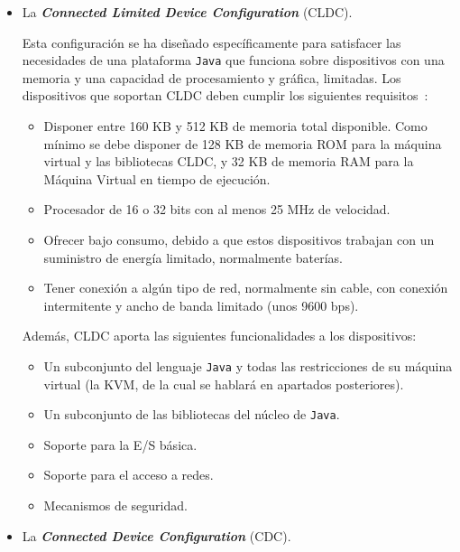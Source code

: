 \begin{itemize}
\item La \emph{\textbf{Connected Limited Device Configuration}} (\acs{CLDC}).

Esta configuración se ha diseñado específicamente para satisfacer las
necesidades de una plataforma \texttt{Java} que funciona sobre dispositivos
con una memoria y una capacidad de procesamiento y gráfica, limitadas.
Los dispositivos que soportan \acs{CLDC} deben cumplir los siguientes
requisitos~\cite{bib:j2me}:
\begin{itemize}
  \item Disponer entre 160 KB y 512 KB de memoria total disponible. Como mínimo
se debe disponer de 128 KB de memoria \acs{ROM} para la máquina virtual
y las bibliotecas \acs{CLDC}, y 32 KB de memoria \acs{RAM} para la Máquina
Virtual en tiempo de ejecución.
  \item Procesador de 16 o 32 bits con al menos 25 MHz de velocidad.
  \item Ofrecer bajo consumo, debido a que estos dispositivos trabajan con un
suministro de energía limitado, normalmente baterías.
  \item Tener conexión a algún tipo de red, normalmente sin cable, con conexión
intermitente y ancho de banda limitado (unos 9600 bps).
\end{itemize}

Además, \acs{CLDC} aporta las siguientes funcionalidades a los dispositivos:
\begin{itemize}
  \item Un subconjunto del lenguaje \texttt{Java} y todas las restricciones
de su máquina virtual (la \acs{KVM}, de la cual se hablará en apartados
posteriores).
  \item Un subconjunto de las bibliotecas del núcleo de \texttt{Java}.
  \item Soporte para la E/S básica.
  \item Soporte para el acceso a redes.
  \item Mecanismos de seguridad.
\end{itemize}

\item La \emph{\textbf{Connected Device Configuration}} (\acs{CDC}).


\end{itemize}
